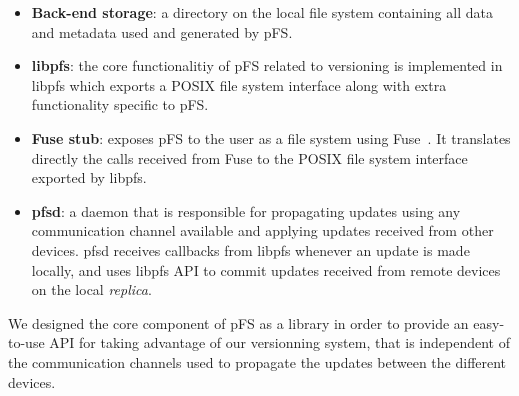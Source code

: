 \begin {itemize}
\item \textbf{Back-end storage}: a directory on the local file system
  containing all data and metadata used and generated by pFS.
\item \textbf{libpfs}: the core functionalitiy of pFS related to
  versioning is implemented in libpfs which exports a POSIX file
  system interface along with extra functionality specific to pFS.
\item \textbf{Fuse stub}: exposes pFS to the user as a file system
  using Fuse~\cite{henk:fuse}. It translates directly the calls
  received from Fuse to the POSIX file system interface exported by
  libpfs.
\item \textbf{pfsd}: a daemon that is responsible for propagating
  updates using any communication channel available and applying
  updates received from other devices. pfsd receives callbacks
  from libpfs whenever an update is made locally, and uses libpfs API
  to commit updates received from remote devices on the local
  \emph{replica}.
\end {itemize}

We designed the core component of pFS as a library in order to provide
an easy-to-use API for taking advantage of our versionning system,
that is independent of the communication channels used to propagate
the updates between the different devices.





